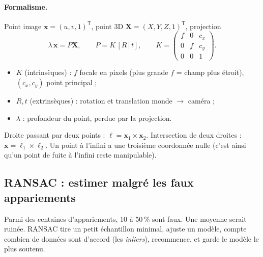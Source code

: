\documentclass[11pt,a4paper]{article}
\newcommand{\T}{^{\mathsf T}}
\newcommand{\x}{\mathbf{x}}
\newcommand{\X}{\mathbf{X}}
\begin{document}
\paragraph{Formalisme.}
Point image $\x=(u,v,1)\T$, point 3D $\X=(X,Y,Z,1)\T$, projection
\[ \lambda\,\x = P\X,\qquad P = K\,[R\,|\,t],\qquad
K=\begin{pmatrix} f & 0 & c_x\\ 0 & f & c_y\\ 0&0&1\end{pmatrix}. \]
\begin{itemize}
  \item $K$ (intrinsèques) : $f$ focale en pixels (plus grande $f$ = champ plus étroit), $(c_x,c_y)$
        point principal ;
  \item $R,t$ (extrinsèques) : rotation et translation monde $\to$ caméra ;
  \item $\lambda$ : profondeur du point, perdue par la projection.
\end{itemize}
Droite passant par deux points : $\boldsymbol\ell=\x_1\times\x_2$. Intersection de deux droites :
$\x=\boldsymbol\ell_1\times\boldsymbol\ell_2$. Un point à l'infini a une troisième coordonnée nulle
(c'est ainsi qu'un point de fuite \og à l'infini \fg{} reste manipulable).

\subsection{RANSAC : estimer malgré les faux appariements}

\begin{intuition}
Parmi des centaines d'appariements, 10 à 50\,\% sont faux. Une moyenne serait ruinée. RANSAC tire un
petit échantillon minimal, ajuste un modèle, compte combien de données sont d'accord (les
\emph{inliers}), recommence, et garde le modèle le plus soutenu.
\end{intuition}
\end{document}
